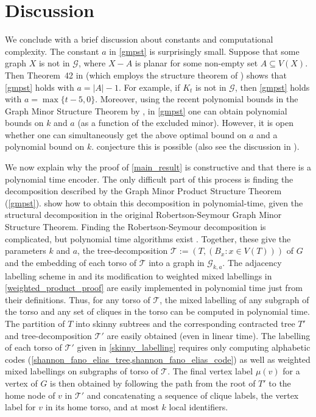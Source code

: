 \documentclass{patmorin}
\newcommand{\calG}{\mathcal{G}}
\newcommand{\calT}{\mathcal{T}}
\begin{document}
\section{Discussion}\label{conclusion}

We conclude with a brief discussion about constants and computational complexity.  The constant $a$ in \cref{gmpst} is surprisingly small. Suppose that some graph $X$ is not in $\calG$, where $X-A$ is planar for some non-empty set $A\subseteq V(X)$. Then Theorem~42 in \citep{dujmovic.joret.ea:planar} (which employs the structure theorem of \citet{DvoTho}) shows that \cref{gmpst} holds with $a=|A|-1$. For example, if $K_t$ is not in $\calG$, then \cref{gmpst} holds with $a=\max\{t-5,0\}$. Moreover, using the recent polynomial bounds in the Graph Minor Structure Theorem by \citet{gorsky2025polynomial}, in \cref{gmpst} one can obtain polynomial bounds on $k$ and $a$ (as a function of the excluded minor). However, it is open whether one can simultaneously get the above optimal bound on $a$ and a polynomial bound on $k$. \citet[Conjecture~18.9]{gorsky2025polynomial} conjecture this is possible (also see the discussion in \citep{GSW26}).


We now explain why the proof of \cref{main_result} is constructive and that there is a polynomial time encoder.  The only difficult part of this process is finding the decomposition described by the Graph Minor Product Structure Theorem (\cref{gmpst}).  \citet{dujmovic.joret.ea:planar} show how to obtain this decomposition in polynomial-time, given the structural decomposition in the original Robertson-Seymour Graph Minor Structure Theorem. Finding the Robertson-Seymour decomposition is complicated, but polynomial time algorithms exist \cite{kawarabayashi2018flat,kawarabayashi2020new,gorsky2025polynomial,demaine2005algorithmic}.  Together, these give the parameters $k$ and $a$, the tree-decomposition $\calT:=(T, (B_x:x\in V(T)))$ of $G$ and the embedding of each torso of $\calT$ into a graph in $\calG_{k,a}$. The adjacency labelling scheme in \cite{dujmovic.esperet.ea:adjacency} and its modification to weighted mixed labellings in \cref{weighted_product_proof} are easily implemented in polynomial time just from their definitions.  Thus, for any torso of $\calT$, the mixed labelling of any subgraph of the torso and any set of cliques in the torso can be computed in polynomial time.  The partition of $T$ into skinny subtrees and the corresponding contracted tree $T'$ and tree-decomposition $\calT'$ are easily obtained (even in linear time).  The labelling of each torso of $\calT'$ given in \cref{skinny_labelling} requires only computing  alphabetic codes (\cref{shannon_fano_elias_tree,shannon_fano_elias_code}) as well as weighted mixed labellings on subgraphs of torso of $\calT$.  The final vertex label $\mu(v)$ for a vertex of $G$ is then obtained by following the path from the root of $T'$ to the home node of $v$ in $\calT'$ and concatenating a sequence of clique labels, the vertex label for $v$ in its home torso, and at most $k$ local identifiers.
\end{document}
